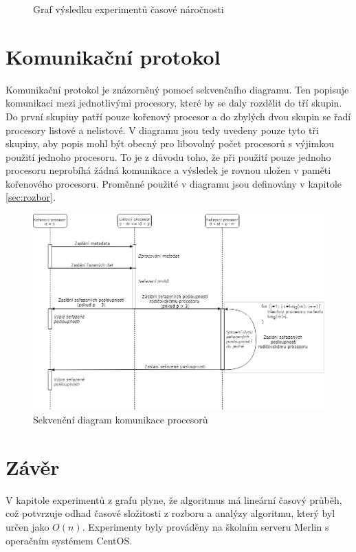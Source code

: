 \documentclass[12pt, a4paper]{article}
\begin{document}
\begin{figure}[h]\centering
	\label{fig:experimenty}
	\caption{Graf výsledku experimentů časové náročnosti}	
\end{figure}

\section{Komunikační protokol}
Komunikační protokol je znázorněný pomocí sekvenčního diagramu. Ten popisuje komunikaci mezi jednotlivými procesory, které by se daly rozdělit do tří skupin. Do první skupiny patří pouze kořenový procesor a do zbylých dvou skupin se řadí procesory listové a nelistové. V diagramu jsou tedy uvedeny pouze tyto tři skupiny, aby popis mohl být obecný pro libovolný počet procesorů s výjimkou použití jednoho procesoru. To je z důvodu toho, že při použití pouze jednoho procesoru neprobíhá žádná komunikace a výsledek je rovnou uložen v paměti kořenového procesoru. Proměnné použité v diagramu jsou definovány v kapitole \ref{sec:rozbor}.

\begin{figure}[H]
	\centering
	\includegraphics[scale=0.53]{pics/seq.png}
	\caption{Sekvenční diagram komunikace procesorů}	
\end{figure}


\section{Závěr}
V kapitole experimentů z grafu plyne, že algoritmus má lineární časový průběh, což potvrzuje odhad časové složitosti z rozboru a analýzy algoritmu, který byl určen jako $O(n)$. Experimenty byly prováděny na školním serveru Merlin s operačním systémem CentOS.
\end{document}
